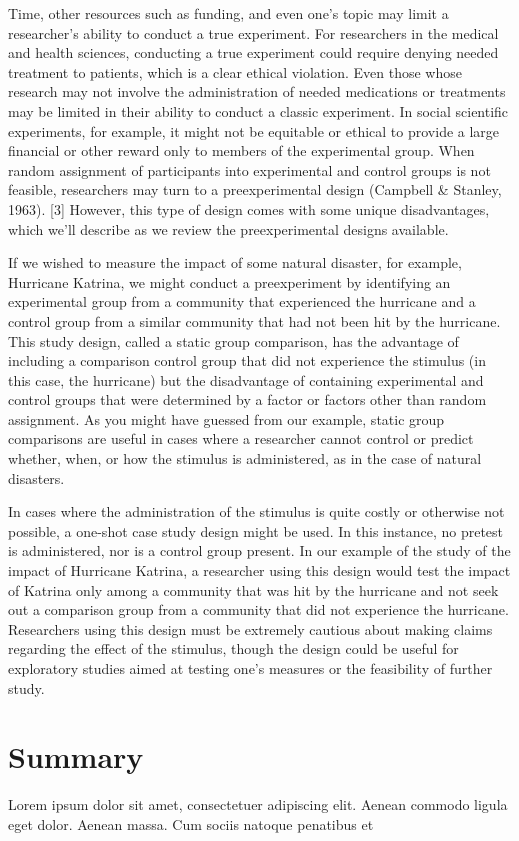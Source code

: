 Time, other resources such as funding, and even one’s topic may limit a researcher’s ability to conduct a true experiment. For researchers in the medical and health sciences, conducting a true experiment could require denying needed treatment to patients, which is a clear ethical violation. Even those whose research may not involve the administration of needed medications or treatments may be limited in their ability to conduct a classic experiment. In social scientific experiments, for example, it might not be equitable or ethical to provide a large financial or other reward only to members of the experimental group. When random assignment of participants into experimental and control groups is not feasible, researchers may turn to a preexperimental design (Campbell \& Stanley, 1963). [3] However, this type of design comes with some unique disadvantages, which we’ll describe as we review the preexperimental designs available.

If we wished to measure the impact of some natural disaster, for example, Hurricane Katrina, we might conduct a preexperiment by identifying an experimental group from a community that experienced the hurricane and a control group from a similar community that had not been hit by the hurricane. This study design, called a static group comparison, has the advantage of including a comparison control group that did not experience the stimulus (in this case, the hurricane) but the disadvantage of containing experimental and control groups that were determined by a factor or factors other than random assignment. As you might have guessed from our example, static group comparisons are useful in cases where a researcher cannot control or predict whether, when, or how the stimulus is administered, as in the case of natural disasters.

In cases where the administration of the stimulus is quite costly or otherwise not possible, a one-shot case study design might be used. In this instance, no pretest is administered, nor is a control group present. In our example of the study of the impact of Hurricane Katrina, a researcher using this design would test the impact of Katrina only among a community that was hit by the hurricane and not seek out a comparison group from a community that did not experience the hurricane. Researchers using this design must be extremely cautious about making claims regarding the effect of the stimulus, though the design could be useful for exploratory studies aimed at testing one’s measures or the feasibility of further study.




\section{Summary}\label{ch09:summary}

Lorem ipsum dolor sit amet, consectetuer adipiscing elit. Aenean commodo ligula eget dolor. Aenean massa. Cum sociis natoque penatibus et
